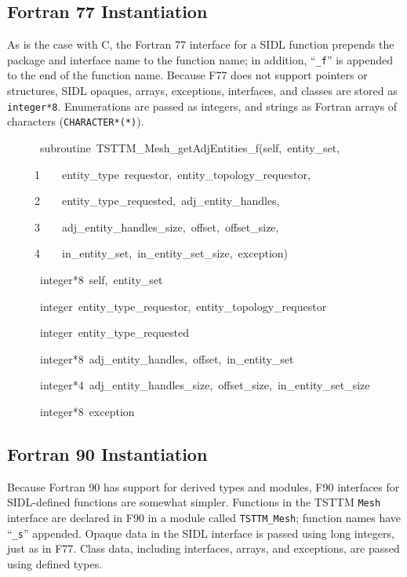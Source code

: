 \subsection*{Fortran 77 Instantiation}

As is the case with C, the Fortran 77 interface for a SIDL function
prepends the package and interface name to the function name; in addition,
{}``\texttt{\_f}'' is appended to the end of the function name.
Because F77 does not support pointers or structures, SIDL opaques,
arrays, exceptions, interfaces, and classes are stored as \texttt{integer{*}8}.
Enumerations are passed as integers, and strings as Fortran arrays
of characters (\texttt{CHARACTER{*}({*})}). 

\begin{lyxcode}
~~~~~~subroutine~TSTTM\_Mesh\_getAdjEntities\_f(self,~entity\_set,~~

~~~~~1~~~~entity\_type~requestor,~entity\_topology\_requestor,~

~~~~~2~~~~entity\_type\_requested,~adj\_entity\_handles,

~~~~~3~~~~adj\_entity\_handles\_size,~offset,~offset\_size,~

~~~~~4~~~~in\_entity\_set,~in\_entity\_set\_size,~exception)~

~~~~~~integer{*}8~self,~entity\_set

~~~~~~integer~entity\_type\_requestor,~entity\_topology\_requestor

~~~~~~integer~entity\_type\_requested

~~~~~~integer{*}8~adj\_entity\_handles,~offset,~in\_entity\_set

~~~~~~integer{*}4~adj\_entity\_handles\_size,~offset\_size,~in\_entity\_set\_size

~~~~~~integer{*}8~exception
\end{lyxcode}

\subsection*{Fortran 90 Instantiation}

Because Fortran 90 has support for derived types and modules, F90
interfaces for SIDL-defined functions are somewhat simpler. Functions
in the TSTTM \texttt{Mesh} interface are declared in F90 in a module
called \texttt{TSTTM\_Mesh}; function names have {}``\texttt{\_s}''
appended. Opaque data in the SIDL interface is passed using long integers,
just as in F77. Class data, including interfaces, arrays, and exceptions,
are passed using defined types.

